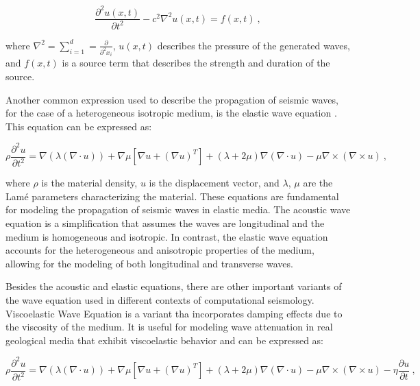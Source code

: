 \documentclass[11pt,twoside]{article}
\begin{document}
\begin{equation*}
\frac{\partial^2 u(x, t)}{\partial t^2} - c^{2} \nabla^2 u(x, t) = f(x, t) \ ,
\label{acoustic}
\end{equation*}

\noindent where $\nabla^2 = \sum_{i=1}^{d} = \frac{\partial}{\partial^{2} x_{i}}$, \( u(x, t) \) describes the pressure of 
the generated waves, and \( f(x, t) \) is a source term that describes the strength and duration of the source.

Another common expression used to describe the propagation of seismic waves, for the case of a heterogeneous 
isotropic medium, is the elastic wave equation \citep{moseley_fast_2018, lehmann_fourier_2023}. This equation can 
be expressed as:

\begin{equation*}
\rho \frac{\partial^2 u}{\partial t^2} = \nabla (\lambda (\nabla \cdot u)) + \nabla \mu \left[\nabla u 
+ (\nabla u)^T\right] + (\lambda + 2\mu) \nabla (\nabla \cdot u) - \mu \nabla \times (\nabla \times u) \ ,
\label{elastic}
\end{equation*}

\noindent where $\rho$ is the material density, $u$ is the displacement vector, and $\lambda$, $\mu$ are the Lamé parameters 
characterizing the material. These equations are fundamental for modeling the propagation of seismic waves in 
elastic media. The acoustic wave equation is a simplification that assumes the waves are longitudinal and the 
medium is homogeneous and isotropic. In contrast, the elastic wave equation accounts for the heterogeneous 
and anisotropic properties of the medium, allowing for the modeling of both longitudinal and transverse waves.

Besides the acoustic and elastic equations, there are other important variants of the wave equation used in different 
contexts of computational seismology. Viscoelastic Wave Equation is a variant tha incorporates damping effects due to 
the viscosity of the medium. It is useful for modeling wave attenuation in real geological media that exhibit 
viscoelastic behavior and can be expressed as:

\begin{equation*}
\rho \frac{\partial^2 u}{\partial t^2} = \nabla (\lambda (\nabla \cdot u)) + \nabla \mu \left[\nabla u + 
(\nabla u)^T\right] + (\lambda + 2\mu) \nabla (\nabla \cdot u) - \mu \nabla \times (\nabla \times u) - 
\eta \frac{\partial u}{\partial t} \ ,
\label{viscoelastic}
\end{equation*}
    
\end{document}
